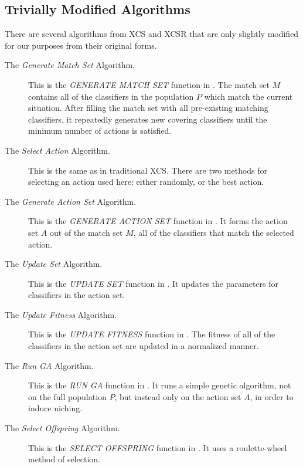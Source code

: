 

\subsection{Trivially Modified Algorithms}
There are several algorithms from XCS and XCSR that are only slightly modified for our purposes from their original forms.

\begin{description}

\item[The \emph{Generate Match Set} Algorithm.]
This is the \emph{GENERATE MATCH SET} function in \cite{ButzWilson}.
The match set $M$ contains all of the classifiers in the population $P$ which match the current situation.  After filling the match set with all pre-existing matching classifiers, it repeatedly generates new covering classifiers until the minimum number of actions is satisfied.

\item[The \emph{Select Action} Algorithm.]
This is the same as in traditional XCS.
There are two methods for selecting an action used here: either randomly, or the best action.

\item[The \emph{Generate Action Set} Algorithm.]
This is the \emph{GENERATE ACTION SET} function in \cite{ButzWilson}.
It forms the action set $A$ out of the match set $M$, all of the classifiers that match the selected action.

\item[The \emph{Update Set} Algorithm.]
This is the \emph{UPDATE SET} function in \cite{ButzWilson}.
It updates the parameters for classifiers in the action set.

\item[The \emph{Update Fitness} Algorithm.]
\label{sec:update-fitness}
This is the \emph{UPDATE FITNESS} function in \cite{ButzWilson}.
The fitness of all of the classifiers in the action set are updated in a normalized manner.

\item[The \emph{Run GA} Algorithm.]
This is the \emph{RUN GA} function in \cite{ButzWilson}.
It runs a simple genetic algorithm, not on the full population $P$, but instead only on the action set $A$, in order to induce niching.

\item [The \emph{Select Offspring} Algorithm.]
This is the \emph{SELECT OFFSPRING} function in \cite{ButzWilson}.
It uses a roulette-wheel method of selection.


\end{description}
